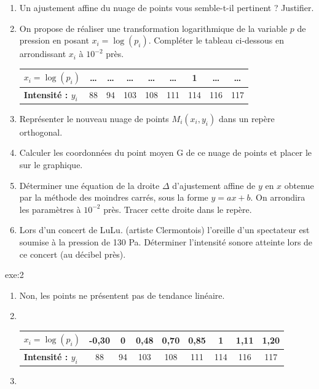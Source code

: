 {\begin{enumerate}
\item Un ajustement affine du nuage de points vous semble-t-il pertinent ? Justifier.
\item On propose de réaliser une transformation logarithmique de la variable $p$ de pression en posant $x_i = \log(p_i)$.
Compléter le tableau ci-dessous en arrondissant $x_i$ à $10^{-2}$ près.
 \begin{center}
  \begin{tabular}{|l|*8{c|}}
	 \hline
	 \textbf{$x_i = \log(p_i)$} & \dots & \dots & \dots & \dots & \dots & 1 & \dots & \dots \\
	 \hline
	 \textbf{Intensité : $y_i$} & 88 & 94 & 103 & 108 & 111 & 114 & 116 & 117 \\
	 \hline
	\end{tabular}
 \end{center}
\item Représenter le nouveau nuage de points $M_i(x_i,y_i)$ dans un repère orthogonal.
\item Calculer les coordonnées du point moyen G de ce nuage de points et placer le sur le graphique.
\item Déterminer une équation de la droite $\Delta$ d'ajustement affine de $y$ en $x$ obtenue par la méthode des moindres carrés,
sous la forme $y=ax+b$. On arrondira les paramètres à $10^{-2}$ près. Tracer cette droite dans le repère.
\item Lors d'un concert de LuLu. (artiste Clermontois) l'oreille d'un spectateur est soumise à la pression de 130 Pa. Déterminer l'intensité
sonore atteinte lors de ce concert (au décibel près).
\end{enumerate}
}{exe:2}{
\begin{enumerate}
\item Non, les points ne présentent pas de tendance linéaire.
\item ~\\
 \begin{center}
  \begin{tabular}{|l|*8{c|}}
	 \hline
	 \textbf{$x_i = \log(p_i)$} & -0,30 & 0 & 0,48 & 0,70 & 0,85 & 1 & 1,11 & 1,20 \\
	 \hline
	 \textbf{Intensité : $y_i$} & 88 & 94 & 103 & 108 & 111 & 114 & 116 & 117 \\
	 \hline
	\end{tabular}
 \end{center}
\item 


\end{enumerate}}
